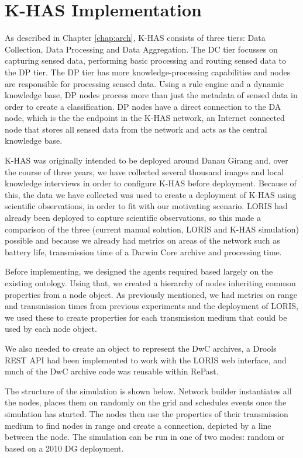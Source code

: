 \section{K-HAS Implementation}
As described in Chapter \ref{chap:arch}, K-HAS consists of three tiers: Data Collection, Data Processing and Data Aggregation. The DC tier focusses on capturing sensed data, performing basic processing and routing sensed data to the DP tier. The DP tier has more knowledge-processing capabilities and nodes are responsible for processing sensed data. Using a rule engine and a dynamic knowledge base, DP nodes process more than just the metadata of sensed data in order to create a classification. DP nodes have a direct connection to the DA node, which is the the endpoint in the K-HAS network, an Internet connected node that stores all sensed data from the network and acts as the central knowledge base.

K-HAS was originally intended to be deployed around Danau Girang and, over the course of three years, we have collected several thousand images and local knowledge interviews in order to configure K-HAS before deployment. Because of this, the data we have collected was used to create a deployment of K-HAS using scientific observations, in order to fit with our motivating scenario. LORIS had already been deployed to capture scientific observations, so this made a comparison of the three (current manual solution, LORIS and K-HAS simulation) possible and because we already had metrics on areas of the network such as battery life, transmission time of a Darwin Core archive and processing time.

Before implementing, we designed the agents required based largely on the existing ontology. Using that, we created a hierarchy of nodes inheriting common properties from a node object. As previously mentioned, we had metrics on range and transmission times from previous experiments and the deployment of LORIS, we used these to create properties for each transmission medium that could be used by each node object.

We also needed to create an object to represent the DwC archives, a Drools REST API had been implemented to work with the LORIS web interface, and much of the DwC archive code was reusable within RePast. 

The structure of the simulation is shown below. Network builder instantiates all the nodes, places them on randomly on the grid and schedules events once the simulation has started. The nodes then use the properties of their transmission medium to find nodes in range and create a connection, depicted by a line between the node. The simulation can be run in one of two modes: random or based on a 2010 DG deployment. 

